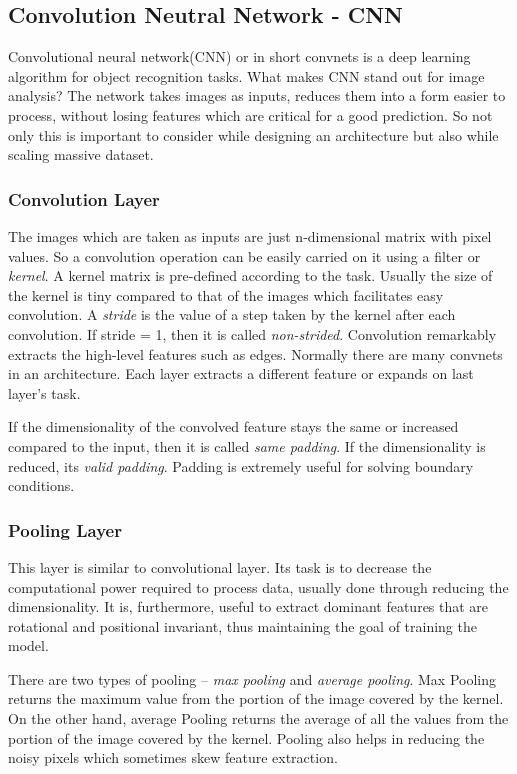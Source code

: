 \subsection{Convolution Neutral Network - CNN}
Convolutional neural network(CNN) or in short convnets is a deep learning algorithm for object recognition
tasks. What makes CNN stand out for image analysis? The network takes images as inputs, reduces them into a form
easier to process, without losing features which are critical for a good prediction. So
not only this is important to consider while designing an architecture but also while
scaling massive dataset.
\subsubsection*{Convolution Layer}
\label{subsubsec:convlayer}
The images which are taken as inputs are just n-dimensional matrix with pixel values. So a
convolution operation can be easily carried on it using a filter or \textit{kernel}. A
kernel matrix is pre-defined according to the task. Usually the size of the kernel is tiny
compared to that of the images which facilitates easy
convolution. A \textit{stride} is the value of a step taken by the kernel after each
convolution. If stride = 1, then it is called \textit{non-strided}. Convolution remarkably
extracts the high-level features such as edges. Normally there are many convnets in an
architecture. Each layer extracts a different feature or expands on last layer's task.

If the dimensionality of the convolved feature stays the same or increased compared to the
input, then it is called \textit{same padding}. If the dimensionality is reduced, its
\textit{valid padding}. Padding is extremely useful for solving boundary conditions.

\subsubsection*{Pooling Layer}
\label{subsubsec:pooling}
This layer is similar to convolutional layer. Its task is to decrease the computational
power required to process data, usually done through reducing the dimensionality. It is,
furthermore, useful to extract dominant features that are rotational and positional
invariant, thus maintaining the goal of training the model.

There are two types of pooling -- \textit{max pooling} and \textit{average pooling}. Max Pooling
returns the maximum value from the portion of the image covered by the kernel.
On the other hand, average Pooling returns the average of all the values
from the portion of the image covered by the kernel. Pooling also helps in reducing the
noisy pixels which sometimes skew feature extraction.

